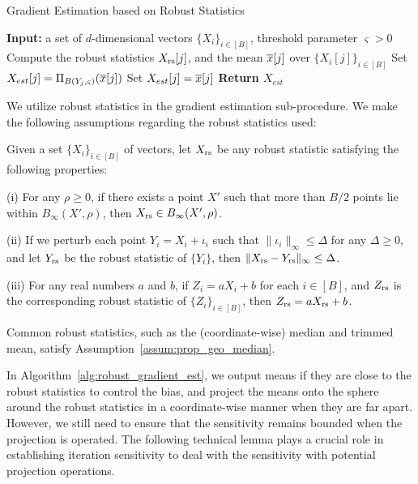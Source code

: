 \begin{algorithm2e}
\caption{Gradient Estimation based on Robust Statistics}
\label{alg:robust_gradient_est}
\textbf{ Input:} a set of $d$-dimensional vectors $\{X_i\}_{i\in[B]}$, threshold parameter $\varsigma>0$\;
{
Compute the robust statistics $X_{\mathrm{rs}}[j]$, and the mean $\overline{x}[j]$ over $\{X_{i}[j]\}_{i\in[B]}$\;
{
Set $X_{est}[j]=\Pi_{B(Y_j,\varsigma)}(\overline{x}[j])$\;
}
\Else
{
Set $X_{est}[j]=\overline{x}[j]$\;
}
}
\textbf{ Return $X_{est}$}
\end{algorithm2e}


We utilize robust statistics in the  
gradient estimation sub-procedure. 
We make the following assumptions regarding the robust statistics used:

\begin{assumption}
\label{assum:prop_geo_median}
    Given a set $\{X_i\}_{i \in [B]}$ of vectors, let $X_{\mathrm{rs}}$ be  
    any robust statistic satisfying the following properties:
    
    (i) For any $\rho \ge 0$, if there exists a point $X'$ such  
        that more than $B/2$ points lie within $B_\infty(X', \rho)$,  
        then $X_{\mathrm{rs}} \in B_\infty(X', \rho)$.
        
(ii) If we perturb each point $Y_i = X_i + \iota_i$ such that  
        $\|\iota_i\|_\infty \le \Delta$ for any $\Delta \ge 0$, and let  
        $Y_{\mathrm{rs}}$ be the robust statistic of $\{Y_i\}$, then  
        $\|X_{\mathrm{rs}} - Y_{\mathrm{rs}}\|_\infty \le \Delta$.
        
    (iii) For any real numbers $a$ and $b$, if $Z_i = aX_i + b$ for  
        each $i \in [B]$, and $Z_{\mathrm{rs}}$ is the corresponding robust  
        statistic of $\{Z_i\}_{i \in [B]}$, then $Z_{\mathrm{rs}} = aX_{\mathrm{rs}} + b$.  
\end{assumption}

\begin{remark}
    Common robust statistics, such as the (coordinate-wise) median and trimmed mean,  
    satisfy Assumption~\ref{assum:prop_geo_median}.
\end{remark}
\vspace{-2mm}
In Algorithm~\ref{alg:robust_gradient_est}, we output means if they are close to the robust statistics to control the bias, and project the means onto the sphere around the robust statistics in a coordinate-wise manner when they are far apart.  
However, we still need to ensure that the sensitivity remains bounded when the projection is operated.  
The following technical lemma plays a crucial role in establishing iteration sensitivity to deal with the sensitivity with potential projection operations.
\vspace{-1mm}

